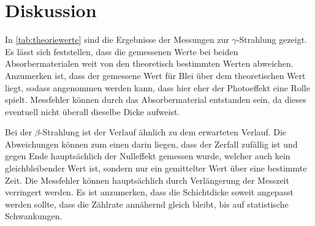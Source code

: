 \section{Diskussion}
\label{sec:Diskussion}

In \autoref{tab:theoriewerte} sind die Ergebnisse der Messungen zur $\gamma$-Strahlung gezeigt.
Es lässt sich feststellen, dass die gemessenen Werte bei beiden Absorbermaterialen weit von den 
theoretisch bestimmten Werten abweichen. Anzumerken ist, dass der gemessene Wert für Blei über dem 
theoretischen Wert liegt, sodass angenommen werden kann, dass hier eher der Photoeffekt eine Rolle spielt.
Messfehler können durch das Absorbermaterial entstanden sein, da dieses eventuell nicht überall dieselbe Dicke 
aufweist.




Bei der $\beta$-Strahlung ist der Verlauf ähnlich zu dem erwarteten Verlauf. Die Abweichungen können zum einen darin liegen, dass der Zerfall 
zufällig ist und gegen Ende hauptsächlich der Nulleffekt gemessen wurde, welcher auch kein gleichbleibender Wert ist, sondern nur ein 
gemittelter Wert über eine bestimmte Zeit.
Die Messfehler können hauptsächlich durch Verlängerung der Messzeit verringert werden.
Es ist anzumerken, dass die Schichtdicke soweit angepasst werden sollte, dass die Zählrate annähernd gleich bleibt, 
bis auf statistische Schwankungen.
